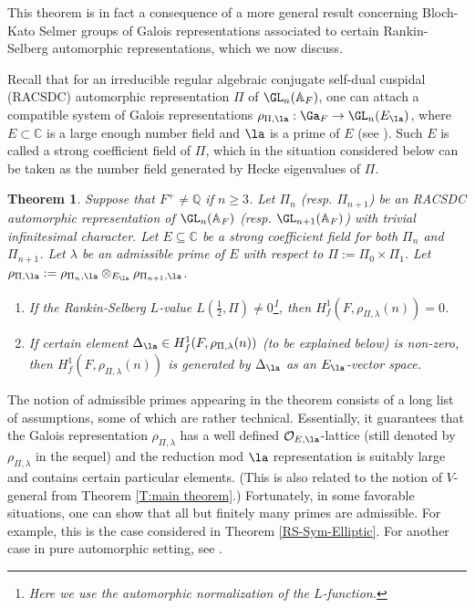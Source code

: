 \documentclass[11pt]{amsart}
\newtheorem{thm}{Theorem}[subsection]
\theoremstyle{definition}
\theoremstyle{definition}
\theoremstyle{definition}
\numberwithin{equation}{section}
\newcommand{\bA}{{\mathbb A}}
\newcommand{\bC}{{\mathbb C}}
\newcommand{\bQ}{{\mathbb Q}}
\newcommand{\mO}{{\mathcal O}}
\begin{document}
This theorem is in fact a consequence of a more general result concerning Bloch-Kato Selmer groups of Galois representations associated to certain Rankin-Selberg automorphic representations, which we now discuss.

Recall that for an irreducible regular algebraic conjugate self-dual cuspidal  (RACSDC) automorphic representation $\Pi$ of $\GL_{n}(\bA_F)$, one can attach a compatible system of Galois representations $\rho_{\Pi,\la}:\Ga_F\to \GL_n(E_\la)$, where $E\subset \bC$ is a large enough number field and $\la$ is a prime of $E$ (see \cite{Chenevier-Harris-Galois-Rep}). Such $E$ is called a strong coefficient field of $\Pi$, which in the situation considered below can be taken as the number field generated by Hecke eigenvalues of $\Pi$.

\begin{thm}\label{BBK for RS}
Suppose that $F^+\neq\bQ$ if $n\geq 3$.
Let $\Pi_n$ (resp. $\Pi_{n+1}$) be an RACSDC automorphic representation of $\GL_{n}(\bA_F)$ (resp. $\GL_{n+1}(\bA_F)$) with trivial infinitesimal character. Let $E\subseteq\bC$ be a strong coefficient field for both $\Pi_n$ and $\Pi_{n+1}$. Let $\lambda$ be an admissible prime of $E$ with respect to $\Pi:=\Pi_0\times \Pi_1$. Let $\rho_{\Pi,\la}:=\rho_{\Pi_n,\la}\otimes_{E_\la} \rho_{\Pi_{n+1},\la}$.
\begin{enumerate}
\item\label{BBK for RS-1} If the Rankin-Selberg $L$-value $L(\frac{1}{2},\Pi)\neq 0$\footnote{Here we use the automorphic normalization of the $L$-function.}, then $H^1_f(F,\rho_{\Pi,\lambda}(n))=0$. 
\item\label{BBK for RS-2} If certain element $\Delta_\la\in H^1_f(F,\rho_{\Pi,\lambda}(n))$ (to be explained below) is non-zero, then $H^1_f(F,\rho_{\Pi,\lambda}(n))$ is generated by $\Delta_\la$ as an $E_\la$-vector space.
\end{enumerate}
\end{thm}

The notion of admissible primes appearing in the theorem consists of a long list of assumptions, some of which are rather technical. Essentially, it guarantees that the Galois representation $\rho_{\Pi,\lambda}$ has a well defined $\mO_{E,\la}$-lattice (still denoted by $\rho_{\Pi,\lambda}$ in the sequel) and the reduction mod $\la$ representation is suitably large and contains certain particular elements. (This is also related to the notion of $V$-general from Theorem \ref{T:main theorem}.)
Fortunately, in some favorable situations, one can show that all but finitely many primes are admissible. 
For example, this is the case considered in Theorem \ref{RS-Sym-Elliptic}. For another case in pure automorphic setting, see \cite[Thm. 1.1.7]{LTXZZ-BBK}.
\end{document}
